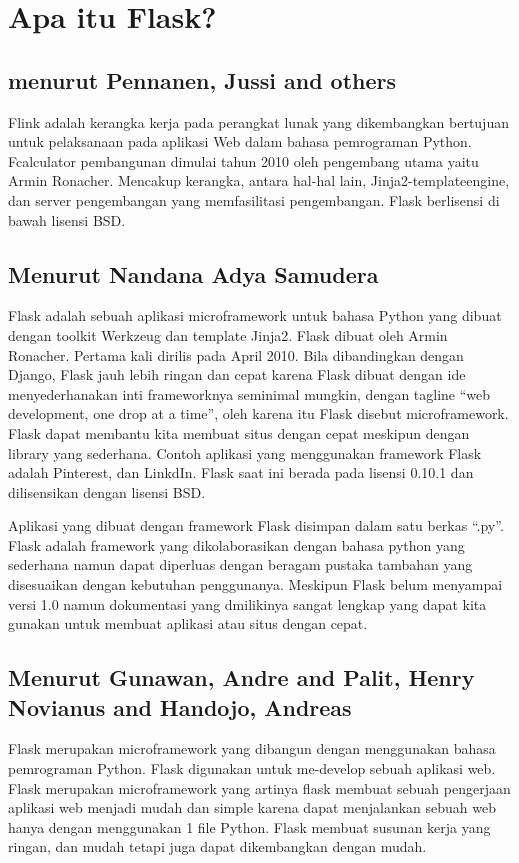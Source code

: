 \documentclass[12pt]{article}
\begin{document}
\section{Apa itu Flask?}
\subsection{menurut Pennanen, Jussi and others}
Flink adalah kerangka kerja pada perangkat lunak yang dikembangkan bertujuan untuk pelaksanaan pada aplikasi Web dalam bahasa pemrograman Python. Fcalculator pembangunan dimulai tahun 2010 oleh pengembang utama yaitu Armin Ronacher. Mencakup kerangka, antara hal-hal lain, Jinja2-templateengine, dan server pengembangan yang memfasilitasi pengembangan. Flask berlisensi di bawah lisensi BSD\cite{pennanen2018sovellus}.

\subsection{Menurut Nandana Adya Samudera}
Flask adalah sebuah aplikasi microframework untuk bahasa Python yang dibuat dengan toolkit Werkzeug dan template Jinja2. Flask dibuat oleh Armin Ronacher. Pertama kali dirilis pada April 2010. Bila dibandingkan dengan Django, Flask jauh lebih ringan dan cepat karena Flask dibuat dengan ide menyederhanakan inti frameworknya seminimal mungkin, dengan tagline “web development, one drop at a time”, oleh karena itu Flask disebut microframework. Flask dapat membantu kita membuat situs dengan cepat meskipun dengan library yang sederhana. Contoh aplikasi yang menggunakan framework Flask adalah Pinterest, dan LinkdIn. Flask saat ini berada pada lisensi 0.10.1 dan dilisensikan dengan lisensi BSD.

Aplikasi yang dibuat dengan framework Flask disimpan dalam satu berkas “.py”. Flask adalah framework yang dikolaborasikan dengan bahasa python yang sederhana namun dapat diperluas dengan beragam pustaka tambahan yang disesuaikan dengan kebutuhan penggunanya. Meskipun Flask belum menyampai versi 1.0 namun dokumentasi yang dmilikinya sangat lengkap yang dapat kita gunakan untuk membuat aplikasi atau situs dengan cepat\cite{samudera2015perancangan}.

\subsection{Menurut Gunawan, Andre and Palit, Henry Novianus and Handojo, Andreas}
Flask merupakan microframework yang dibangun dengan menggunakan bahasa pemrograman Python. Flask digunakan untuk me-develop sebuah aplikasi web. Flask merupakan microframework yang artinya flask membuat sebuah pengerjaan aplikasi web menjadi mudah dan simple karena dapat menjalankan sebuah web hanya dengan menggunakan 1 file Python. Flask membuat susunan kerja yang ringan, dan mudah tetapi juga dapat dikembangkan dengan mudah\cite{gunawan2018aplikasi}.
\end{document}
